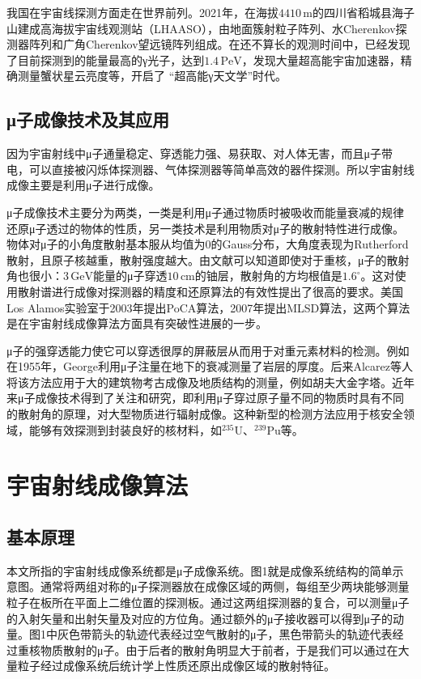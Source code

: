 \documentclass[fontset=none,zihao=-4]{ctexart}
\begin{document}
我国在宇宙线探测方面走在世界前列。2021年，在海拔$4410\,\mathrm{m}$的四川省稻城县海子山建成高海拔宇宙线观测站（LHAASO），由地面簇射粒子阵列、水Cherenkov探测器阵列和广角Cherenkov望远镜阵列组成。在还不算长的观测时间中，已经发现了目前探测到的能量最高的γ光子，达到$1.4\,\mathrm{PeV}$，发现大量超高能宇宙加速器，精确测量蟹状星云亮度等，开启了 “超高能γ天文学”时代。

\subsection{μ子成像技术及其应用}

因为宇宙射线中μ子通量稳定、穿透能力强、易获取、对人体无害，而且μ子带电，可以直接被闪烁体探测器、气体探测器等简单高效的器件探测。所以宇宙射线成像主要是利用μ子进行成像。

μ子成像技术主要分为两类，一类是利用μ子通过物质时被吸收而能量衰减的规律还原μ子透过的物体的性质，另一类技术是利用物质对μ子的散射特性进行成像。物体对μ子的小角度散射基本服从均值为0的Gauss分布，大角度表现为Rutherford散射，且原子核越重，散射强度越大。由文献\cite{schultz2003cosmic}可以知道即使对于重核，μ子的散射角也很小：$3\,\mathrm{GeV}$能量的μ子穿透$10\,\mathrm{cm}$的铀层，散射角的方均根值是$1.6^\circ$。这对使用散射谱进行成像对探测器的精度和还原算法的有效性提出了很高的要求。美国Los Alamos实验室于2003年提出PoCA算法\cite{schultz2004image}，2007年提出MLSD算法\cite{schultz2007statistical}，这两个算法是在宇宙射线成像算法方面具有突破性进展的一步。

μ子的强穿透能力使它可以穿透很厚的屏蔽层从而用于对重元素材料的检测。例如在1955年，George利用μ子注量在地下的衰减测量了岩层的厚度。后来Alcarez等人将该方法应用于大的建筑物考古成像及地质结构的测量，例如胡夫大金字塔。近年来μ子成像技术得到了关注和研究，即利用μ子穿过原子量不同的物质时具有不同的散射角的原理，对大型物质进行辐射成像。这种新型的检测方法应用于核安全领域，能够有效探测到封装良好的核材料，如$^{235}\mathrm{U}$、$^{239}\mathrm{Pu}$等。

\clearpage\section{宇宙射线成像算法}

\subsection{基本原理}

本文所指的宇宙射线成像系统都是μ子成像系统。图1就是成像系统结构的简单示意图。通常将两组对称的μ子探测器放在成像区域的两侧，每组至少两块能够测量粒子在板所在平面上二维位置的探测板。通过这两组探测器的复合，可以测量μ子的入射矢量和出射矢量及对应的方位角。通过额外的μ子接收器可以得到μ子的动量。图1中灰色带箭头的轨迹代表经过空气散射的μ子，黑色带箭头的轨迹代表经过重核物质散射的μ子。由于后者的散射角明显大于前者，于是我们可以通过在大量粒子经过成像系统后统计学上性质还原出成像区域的散射特征。
\end{document}
